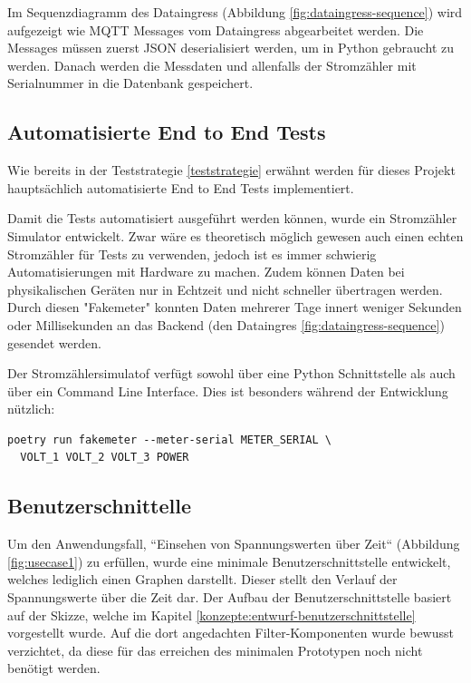 Im Sequenzdiagramm des Dataingress (Abbildung \ref{fig:dataingress-sequence}) wird aufgezeigt
wie \ac{MQTT} Messages vom Dataingress abgearbeitet werden.
Die Messages müssen zuerst \ac{JSON} deserialisiert werden, um in Python
gebraucht zu werden. Danach werden die Messdaten und allenfalls der
Stromzähler mit Serialnummer in die Datenbank gespeichert.

\subsection{Automatisierte End to End Tests}

Wie bereits in der Teststrategie \ref{teststrategie} erwähnt werden für dieses Projekt
hauptsächlich automatisierte End to End Tests implementiert.

Damit die Tests automatisiert ausgeführt werden können, wurde ein Stromzähler Simulator entwickelt.
Zwar wäre es theoretisch möglich gewesen auch einen echten Stromzähler für Tests zu verwenden,
jedoch ist es immer schwierig Automatisierungen mit Hardware zu machen. Zudem können
Daten bei physikalischen Geräten nur in Echtzeit und nicht schneller übertragen werden.
Durch diesen "Fakemeter" konnten Daten mehrerer Tage innert weniger Sekunden oder Millisekunden
an das Backend (den Dataingres \ref{fig:dataingress-sequence}) gesendet werden.

Der Stromzählersimulatof verfügt sowohl über eine Python Schnittstelle als auch über
ein Command Line Interface. Dies ist besonders während der Entwicklung nützlich:

\begin{verbatim}
poetry run fakemeter --meter-serial METER_SERIAL \
  VOLT_1 VOLT_2 VOLT_3 POWER
\end{verbatim}


\subsection{Benutzerschnittelle}
Um den Anwendungsfall, ``Einsehen von Spannungswerten über Zeit`` (Abbildung \ref{fig:usecase1}) zu erfüllen,
wurde eine minimale Benutzerschnittstelle entwickelt, welches lediglich einen Graphen darstellt.
Dieser stellt den Verlauf der Spannungswerte über die Zeit dar.
Der Aufbau der Benutzerschnittstelle basiert auf der Skizze,
welche im Kapitel \ref{konzepte:entwurf-benutzerschnittstelle} vorgestellt wurde.
Auf die dort angedachten Filter-Komponenten wurde bewusst verzichtet, da diese für das erreichen des
minimalen Prototypen noch nicht benötigt werden.

